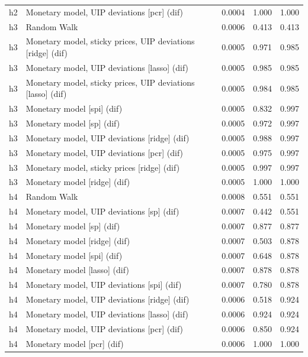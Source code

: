 \begin{ThreePartTable}
\begin{longtable}[t]{cp{5.5cm}ccc}
h2 & \raggedright Monetary model, UIP deviations [pcr] (dif) & 0.0004 & 1.000 & 1.000\\
\addlinespace
h3 & \raggedright Random Walk & 0.0006 & 0.413 & 0.413\\
h3 & \raggedright Monetary model, sticky prices, UIP deviations [ridge] (dif) & 0.0005 & 0.971 & 0.985\\
h3 & \raggedright Monetary model, UIP deviations [lasso] (dif) & 0.0005 & 0.985 & 0.985\\
h3 & \raggedright Monetary model, sticky prices, UIP deviations [lasso] (dif) & 0.0005 & 0.984 & 0.985\\
h3 & \raggedright Monetary model [spi] (dif) & 0.0005 & 0.832 & 0.997\\
h3 & \raggedright Monetary model [sp] (dif) & 0.0005 & 0.972 & 0.997\\
h3 & \raggedright Monetary model, UIP deviations [ridge] (dif) & 0.0005 & 0.988 & 0.997\\
h3 & \raggedright Monetary model, UIP deviations [pcr] (dif) & 0.0005 & 0.975 & 0.997\\
h3 & \raggedright Monetary model, sticky prices [ridge] (dif) & 0.0005 & 0.997 & 0.997\\
h3 & \raggedright Monetary model [ridge] (dif) & 0.0005 & 1.000 & 1.000\\
\addlinespace
h4 & \raggedright Random Walk & 0.0008 & 0.551 & 0.551\\
h4 & \raggedright Monetary model, UIP deviations [sp] (dif) & 0.0007 & 0.442 & 0.551\\
h4 & \raggedright Monetary model [sp] (dif) & 0.0007 & 0.877 & 0.877\\
h4 & \raggedright Monetary model [ridge] (dif) & 0.0007 & 0.503 & 0.878\\
h4 & \raggedright Monetary model [spi] (dif) & 0.0007 & 0.648 & 0.878\\
h4 & \raggedright Monetary model [lasso] (dif) & 0.0007 & 0.878 & 0.878\\
h4 & \raggedright Monetary model, UIP deviations [spi] (dif) & 0.0007 & 0.780 & 0.878\\
h4 & \raggedright Monetary model, UIP deviations [ridge] (dif) & 0.0006 & 0.518 & 0.924\\
h4 & \raggedright Monetary model, UIP deviations [lasso] (dif) & 0.0006 & 0.924 & 0.924\\
h4 & \raggedright Monetary model, UIP deviations [pcr] (dif) & 0.0006 & 0.850 & 0.924\\
h4 & \raggedright Monetary model [pcr] (dif) & 0.0006 & 1.000 & 1.000\\

\end{longtable}
\end{ThreePartTable}
